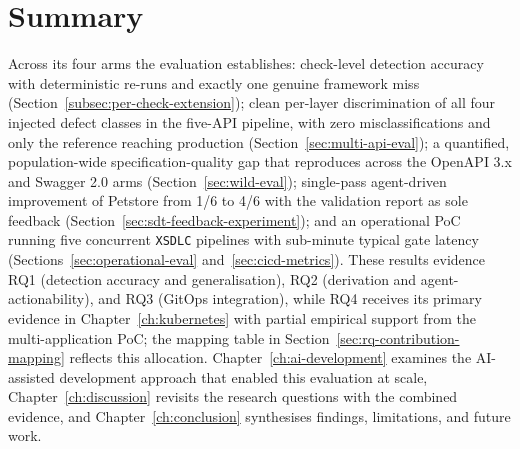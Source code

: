 \section{Summary}
\label{sec:eval-summary}

Across its four arms the evaluation establishes: check-level detection accuracy with deterministic re-runs and exactly one genuine framework miss (Section~\ref{subsec:per-check-extension}); clean per-layer discrimination of all four injected defect classes in the five-API pipeline, with zero misclassifications and only the reference reaching production (Section~\ref{sec:multi-api-eval}); a quantified, population-wide specification-quality gap that reproduces across the OpenAPI 3.x and Swagger 2.0 arms (Section~\ref{sec:wild-eval}); single-pass agent-driven improvement of Petstore from 1/6 to 4/6 with the validation report as sole feedback (Section~\ref{sec:sdt-feedback-experiment}); and an operational PoC running five concurrent \texttt{XSDLC} pipelines with sub-minute typical gate latency (Sections~\ref{sec:operational-eval} and~\ref{sec:cicd-metrics}). These results evidence RQ1 (detection accuracy and generalisation), RQ2 (derivation and agent-actionability), and RQ3 (GitOps integration), while RQ4 receives its primary evidence in Chapter~\ref{ch:kubernetes} with partial empirical support from the multi-application PoC; the mapping table in Section~\ref{sec:rq-contribution-mapping} reflects this allocation. Chapter~\ref{ch:ai-development} examines the AI-assisted development approach that enabled this evaluation at scale, Chapter~\ref{ch:discussion} revisits the research questions with the combined evidence, and Chapter~\ref{ch:conclusion} synthesises findings, limitations, and future work.
